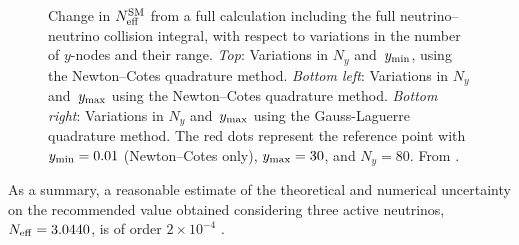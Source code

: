 \documentclass[notitlepage,nofootinbib,showpacs,preprintnumbers,amsmath,amssymb,superscriptaddress,prd,onecolumn]{revtex4-1}
\newcommand{\Neff}{\ensuremath{N_{\rm eff}}}
\begin{document}
\begin{figure}[t]
\begin{center}
\begin{subfigure}{.49\textwidth}
\end{subfigure}
\end{center}
\caption{Change in $\Neff^{\rm SM}$ from a full calculation including the full neutrino--neutrino collision integral, with respect to variations in the number of $y$-nodes and their range.
{\it Top}: Variations in $N_y$ and~$y_{\rm min}$, using the Newton--Cotes quadrature method.
{\it Bottom left}: Variations in $N_y$ and~$y_{\rm max}$ using the Newton--Cotes quadrature method.
{\it Bottom right}: Variations in $N_y$ and~$y_{\rm max}$ using the Gauss-Laguerre quadrature method.
The red dots represent the reference point with
$y_{\rm min}=0.01$ (Newton--Cotes only), $y_{\rm max}=30$, and $N_y = 80$.
From \cite{Bennett:2020zkv}.
\label{fig:Ny_yrange}}
\end{figure}

As a summary, a reasonable estimate of the theoretical and numerical uncertainty on the recommended value
obtained considering three active neutrinos,
$\Neff=3.0440$,
is of order $2\times10^{-4}$ \cite{Bennett:2020zkv}.
\end{document}

